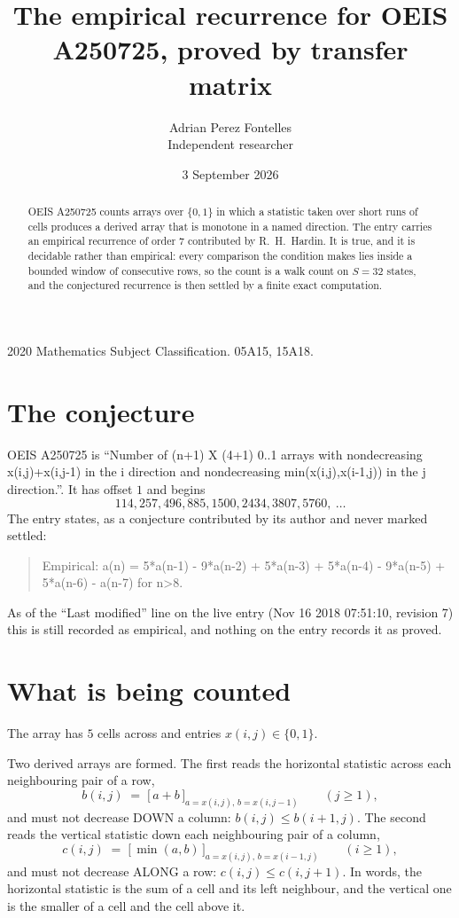 \documentclass[11pt,a4paper]{article}
\title{The empirical recurrence for OEIS A250725, proved by transfer matrix}
\author{Adrian Perez Fontelles\\ \small Independent researcher}
\date{3 September 2026}
\theoremstyle{plain}
\theoremstyle{definition}
\begin{document}
\maketitle

\begin{abstract}
OEIS A250725 counts arrays over $\{0,1\}$ in which a statistic taken over short runs
of cells produces a derived array that is monotone in a named direction. The entry carries an
empirical recurrence of order $7$ contributed by R.~H.~Hardin. It is true, and it is
decidable rather than empirical: every comparison the condition makes lies inside a bounded
window of consecutive rows, so the count is a walk count on $S=32$ states, and the
conjectured recurrence is then settled by a finite exact computation.
\end{abstract}

\noindent\small 2020 Mathematics Subject Classification. 05A15, 15A18.\normalsize

\section{The conjecture}

OEIS A250725 is ``Number of (n+1) X (4+1) 0..1 arrays with nondecreasing x(i,j)+x(i,j-1) in the i direction and nondecreasing min(x(i,j),x(i-1,j)) in the j direction.''. It has offset $1$ and begins
\[
114, 257, 496, 885, 1500, 2434, 3807, 5760,\ \dots
\]
The entry states, as a conjecture contributed by its author and never marked settled:
\begin{quote}
Empirical: a(n) = 5*a(n-1) - 9*a(n-2) + 5*a(n-3) + 5*a(n-4) - 9*a(n-5) + 5*a(n-6) - a(n-7) for n>8.
\end{quote}
As of the ``Last modified'' line on the live entry (Nov 16 2018 07:51:10, revision 7) this is still
recorded as empirical, and nothing on the entry records it as proved.

\section{What is being counted}

The array has $5$ cells across and entries $x(i,j)\in\{0,1\}$.

Two derived arrays are formed. The first reads the horizontal statistic across each
neighbouring pair of a row,
\[
b(i,j)\;=\;\bigl[\,a+b\,\bigr]_{a=x(i,j),\,b=x(i,j-1)}\qquad (j\ge1),
\]
and must not decrease DOWN a column: $b(i,j)\le b(i{+}1,j)$. The second reads the vertical
statistic down each neighbouring pair of a column,
\[
c(i,j)\;=\;\bigl[\,\min(a,b)\,\bigr]_{a=x(i,j),\,b=x(i{-}1,j)}\qquad (i\ge1),
\]
and must not decrease ALONG a row: $c(i,j)\le c(i,j{+}1)$. In words, the horizontal statistic
is the sum of a cell and its left neighbour, and the vertical one is
the smaller of a cell and the cell above it.
\end{document}
